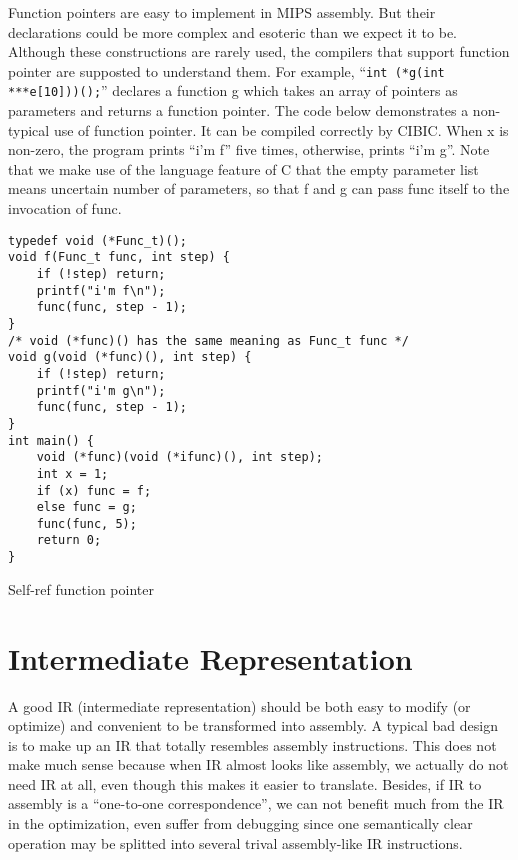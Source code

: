 \documentclass[10pt, a4paper]{article}
\begin{document}
Function pointers are easy to implement in MIPS assembly. But their declarations
could be more complex and esoteric than we expect it to be. Although these
constructions are rarely used, the compilers that support function pointer are
supposted to understand them. For example, ``\texttt{int (*g(int
***e[10]))();}'' declares a function g which takes an array of pointers as
parameters and returns a function pointer. The code below demonstrates a
non-typical use of function pointer. It can be compiled correctly by CIBIC. When
x is non-zero, the program prints ``i'm f'' five times, otherwise, prints ``i'm
g''. Note that we make use of the language feature of C that the empty parameter
list means uncertain number of parameters, so that f and g can pass func itself
to the invocation of func.
\begin{listing}[H]
    \centering
    \begin{verbatim}
typedef void (*Func_t)();
void f(Func_t func, int step) {
    if (!step) return;
    printf("i'm f\n");
    func(func, step - 1);
}
/* void (*func)() has the same meaning as Func_t func */
void g(void (*func)(), int step) {
    if (!step) return;
    printf("i'm g\n");
    func(func, step - 1);
}
int main() {
    void (*func)(void (*ifunc)(), int step);
    int x = 1;
    if (x) func = f;
    else func = g;
    func(func, 5);
    return 0;
}
    \end{verbatim}
    \caption {Self-ref function pointer}
\end{listing}
\section{Intermediate Representation}
A good IR (intermediate representation) should be both easy to modify (or
optimize) and convenient to be transformed into assembly. A typical bad design
is to make up an IR that totally resembles assembly instructions. This does not
make much sense because when IR almost looks like assembly, we actually do not
need IR at all, even though this makes it easier to translate. Besides, if IR to
assembly is a ``one-to-one correspondence'', we can not benefit much from the IR
in the optimization, even suffer from debugging since one semantically clear
operation may be splitted into several trival assembly-like IR instructions.
\end{document}
